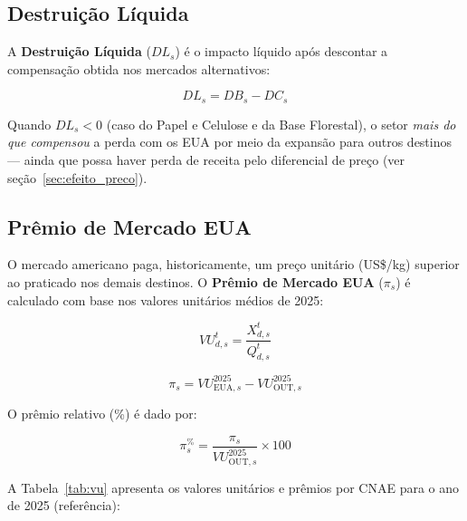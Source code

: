 \documentclass[12pt, a4paper]{article}
\begin{document}
\subsection{Destruição Líquida}

A \textbf{Destruição Líquida} (\(DL_s\)) é o impacto líquido após descontar
a compensação obtida nos mercados alternativos:

\begin{equation}
  \boxed{
    DL_s = DB_s - DC_s
  }
  \label{eq:dl}
\end{equation}

Quando \(DL_s < 0\) (caso do Papel e Celulose e da Base Florestal),
o setor \emph{mais do que compensou} a perda com os EUA por meio da
expansão para outros destinos — ainda que possa haver perda de receita
pelo diferencial de preço (ver seção~\ref{sec:efeito_preco}).

\subsection{Prêmio de Mercado EUA}
\label{sec:premio}

O mercado americano paga, historicamente, um preço unitário (US\$/kg)
superior ao praticado nos demais destinos. O \textbf{Prêmio de Mercado
EUA} (\(\pi_s\)) é calculado com base nos valores unitários médios de 2025:

\begin{equation}
  VU_{d,s}^{t} = \frac{X_{d,s}^{t}}{Q_{d,s}^{t}}
  \label{eq:vu}
\end{equation}

\begin{equation}
  \boxed{
    \pi_s = VU_{\text{EUA},s}^{2025} - VU_{\text{OUT},s}^{2025}
  }
  \label{eq:premio}
\end{equation}

O prêmio relativo (\%) é dado por:

\begin{equation}
  \pi_s^{\%} = \frac{\pi_s}{VU_{\text{OUT},s}^{2025}} \times 100
  \label{eq:premio_pct}
\end{equation}

A Tabela~\ref{tab:vu} apresenta os valores unitários e prêmios por CNAE
para o ano de 2025 (referência):
\end{document}
